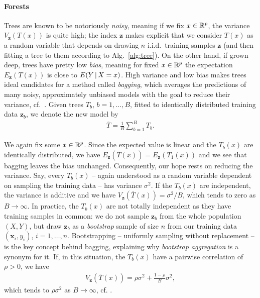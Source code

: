 \paragraph{Forests}
Trees are known to be notoriously \textit{noisy}, meaning if we fix $x \in \mathbb{R}^p$, the variance 
$V_\mathbf{z}(T(x))$ is quite high; the index $\mathbf{z}$ makes explicit that we consider $T(x)$ as 
a random variable that depends on drawing $n$ i.i.d.\ training samples $\mathbf{z}$ (and 
then fitting a tree to them according to Alg.\ \ref{alg:tree}). On the other hand, if grown deep,
trees have pretty low \textit{bias}, meaning for fixed $x \in \mathbb{R}^p$ the expectation $E_\mathbf{z}(T(x))$ 
is close to $E(Y \,|\, X = x)$. High variance and low bias makes trees 
ideal candidates for a method called \textit{bagging}, which averages the predictions of many noisy, 
approximately unbiased models with the goal to reduce their variance, cf.\ \cite{breiman96}. Given 
trees $T_b$, $b = 1, 
\ldots, B$, fitted to identically distributed training data $\mathbf{z}_b$, we denote the new model 
by 
\begin{align}
    \overline{T} = \frac{1}{B} \sum_{b=1}^B T_b.
\end{align}

We again fix some $x \in \mathbb{R}^p$. Since the expected value is linear and the $T_b(x)$ are identically 
distributed, we have $E_\mathbf{z}(\overline{T}(x)) = E_\mathbf{z}(T_1(x))$ and we see that bagging 
leaves the bias unchanged. Consequently, our hope rests on reducing the variance. Say, every 
$T_b(x)$ -- again understood as a random variable dependent on sampling the training data -- has 
variance $\sigma^2$. If the $T_b(x)$ are independent, the variance is additive and we have 
$V_\mathbf{z}(\overline{T}(x)) = \sigma^2/B$, which tends to zero as $B \to \infty$. In practice, 
the $T_b(x)$ are not totally independent as they have training samples in common: we do not 
sample $\mathbf{z}_b$ from the whole population $(X, Y)$, but draw $\mathbf{z}_b$ as a 
\textit{bootstrap} sample of size $n$ from our training 
data $(\mathbf{x}_i, y_i)$, $i = 1, \ldots, n$. Bootstrapping -- uniformly sampling without 
replacement -- is the key concept behind bagging, 
explaining why \textit{bootstrap aggregation} is a synonym for it. If, in this situation, the 
$T_b(x)$ have a pairwise correlation of $\rho > 0$, we have 
\begin{align}
    V_\mathbf{z}\left(\overline{T}(x)\right) = \rho \sigma^2 + \frac{1-\rho}{B} \sigma^2,
\end{align}
which tends to $\rho \sigma^2$ as $B \to \infty$, cf. \cite[Eq. (15.1)]{elem-stat-learn01}.

